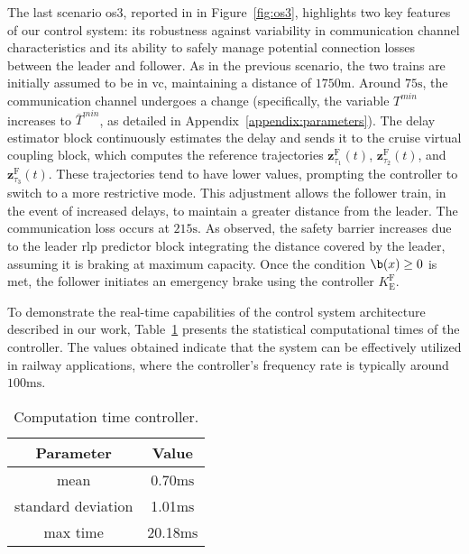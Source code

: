 \documentclass[letterpaper, 10 pt, conference]{ieeeconf}
\theoremstyle{definition}
\theoremstyle{nopoint}
\newcommand{\tildeAdd}{~}
\begin{document}
			
		The last scenario \gls{os}3, reported in in Figure\tildeAdd\ref{fig:os3},  highlights two key features of our control system: its robustness against variability in communication channel characteristics and its ability to safely manage potential connection losses between the leader and follower.
		As in the previous scenario, the two trains are initially assumed to be in \gls{vc}, maintaining a distance of $1750\unit{\meter}$. Around $75\unit{\second}$, the communication channel undergoes a change (specifically, the variable $T^{\textit{min}}$ increases to $\overline{T}^{\textit{min}}$, as detailed in Appendix~\ref{appendix:parameters}). The delay estimator block continuously estimates the delay and sends it to the cruise virtual coupling block, which computes the reference trajectories $\mathbf{z}_{\tau_1}^\mathrm{F}(t)$, $\mathbf{z}_{\tau_2}^\mathrm{F}(t)$, and $\mathbf{z}_{\tau_3}^\mathrm{F}(t)$. These trajectories tend to have lower values, prompting the controller to switch to a more restrictive mode. This adjustment allows the follower train, in the event of increased delays, to maintain a greater distance from the leader.
		The communication loss occurs at $215\unit{\second}$. As observed, the safety barrier increases due to the leader \gls{rlp} predictor block integrating the distance covered by the leader, assuming it is braking at maximum capacity. Once the condition $\b(x) \geq 0$ is met, the follower initiates an emergency brake using the controller $K_{\mathrm{E}}^{\mathrm{F}}$.
		
				
		
		
		To demonstrate the real-time capabilities of the control system architecture described in our work, Table~\ref{tab:computationController} presents the statistical computational times of the controller. The values obtained indicate that the system can be effectively utilized in railway applications, where the controller's frequency rate is typically around $100\unit{\milli\second}$.
		\begin{table}[!h]
			\begin{center}
				\caption{Computation time controller.}
				\label{tab:computationController}
				\begin{tabular}{ |c|c| } 
					\hline
					\textbf{Parameter} & \textbf{Value} \\
					\hline
					mean	& 0.70$\unit{\milli\second}$ \\
					standard deviation	& 1.01$\unit{\milli\second}$ \\
					max time	& 20.18$\unit{\milli\second}$ \\
					\hline
				\end{tabular}
			\end{center}
		\end{table}
\end{document}
